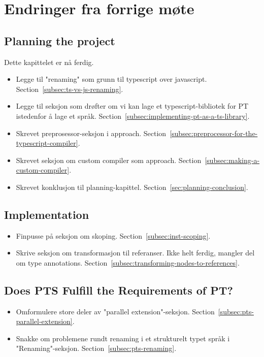 
\chapter*{Endringer fra forrige møte}

\section*{Planning the project}

Dette kapittelet er nå ferdig.

\begin{itemize}
    \item Legge til "renaming" som grunn til typescript over javascript.
    Section~\vref{subsec:ts-vs-js-renaming}.
    \item Legge til seksjon som drøfter om vi kan lage et typescript-bibliotek for PT istedenfor å lage et språk.
    Section~\vref{subsec:implementing-pt-as-a-ts-library}.
    \item Skrevet preprosessor-seksjon i approach.
    Section~\vref{subsec:preprocessor-for-the-typescript-compiler}.
    \item Skrevet seksjon om custom compiler som approach.
    Section~\vref{subsec:making-a-custom-compiler}.
    \item Skrevet konklusjon til planning-kapittel.
    Section~\vref{sec:planning-conclusion}.
\end{itemize}

\section*{Implementation}

\begin{itemize}
    \item Finpusse på seksjon om skoping.
    Section~\vref{subsec:inst-scoping}.
    \item Skrive seksjon om transformasjon til referanser.
    Ikke helt ferdig, mangler del om type annotations.
    Section~\vref{subsec:transforming-nodes-to-references}.
\end{itemize}

\section*{Does PTS Fulfill the Requirements of PT?}

\begin{itemize}
    \item Omformulere store deler av "parallel extension"-seksjon.
    Section~\vref{subsec:pts-parallel-extension}.
    \item Snakke om problemene rundt renaming i et strukturelt typet språk i "Renaming"-seksjon.
    Section~\vref{subsec:pts-renaming}.
\end{itemize}
